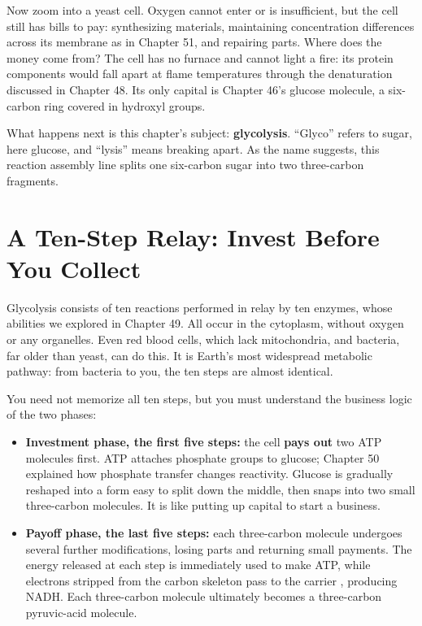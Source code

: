 Now zoom into a yeast cell. Oxygen cannot enter or is insufficient, but the cell still has bills to pay: synthesizing materials, maintaining concentration differences across its membrane as in Chapter 51, and repairing parts. Where does the money come from? The cell has no furnace and cannot light a fire: its protein components would fall apart at flame temperatures through the denaturation discussed in Chapter 48. Its only capital is Chapter 46's glucose molecule, a six-carbon ring covered in hydroxyl groups.

What happens next is this chapter's subject: \textbf{glycolysis}. ``Glyco'' refers to sugar, here glucose, and ``lysis'' means breaking apart. As the name suggests, this reaction assembly line splits one six-carbon sugar into two three-carbon fragments.

\section{A Ten-Step Relay: Invest Before You Collect}

Glycolysis consists of ten reactions performed in relay by ten enzymes, whose abilities we explored in Chapter 49. All occur in the cytoplasm, without oxygen or any organelles. Even red blood cells, which lack mitochondria, and bacteria, far older than yeast, can do this. It is Earth's most widespread metabolic pathway: from bacteria to you, the ten steps are almost identical.

You need not memorize all ten steps, but you must understand the business logic of the two phases:

\begin{itemize}[itemsep=2pt]
\item \textbf{Investment phase, the first five steps:} the cell \textbf{pays out} two ATP molecules first. ATP attaches phosphate groups to glucose; Chapter 50 explained how phosphate transfer changes reactivity. Glucose is gradually reshaped into a form easy to split down the middle, then snaps into two small three-carbon molecules. It is like putting up capital to start a business.
\item \textbf{Payoff phase, the last five steps:} each three-carbon molecule undergoes several further modifications, losing parts and returning small payments. The energy released at each step is immediately used to make ATP, while electrons stripped from the carbon skeleton pass to the carrier , producing NADH. Each three-carbon molecule ultimately becomes a three-carbon pyruvic-acid molecule.
\end{itemize}

